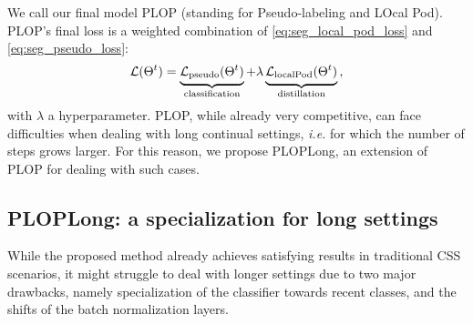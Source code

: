 We call our final model PLOP (standing for Pseudo-labeling and LOcal Pod). PLOP's final loss is a
weighted combination of \autoref{eq:seg_local_pod_loss} and \autoref{eq:seg_pseudo_loss}:
%
\begin{equation}
    \mathcal{L}(\Theta^t) = \underbrace{\strut \mathcal{L}_\text{pseudo}(\Theta^t)}_\text{classification} + \lambda\underbrace{\strut \mathcal{L}_\text{localPod}(\Theta^t)}_\text{distillation}\,,
    \label{eq:seg_complete_loss}
\end{equation}
%
\noindent with $\lambda$ a hyperparameter. PLOP, while already very competitive, can face difficulties when
dealing with long continual settings, \textit{i.e.} for which the number of steps grows larger. For
this reason, we propose PLOPLong, an extension of PLOP for dealing with such cases.

\subsection{PLOPLong: a specialization for long settings}\label{sec:seg_plopv2}

While the proposed method already achieves satisfying results in traditional \ac{CSS} scenarios, it might
struggle to deal with longer settings due to two major drawbacks, namely specialization of the
classifier towards recent classes, and the shifts of the batch normalization layers.

